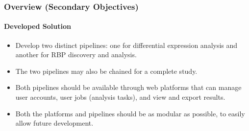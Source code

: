 \documentclass[xcolor=dvipsnames]{beamer}
\begin{document}
\begin{frame}[allowframebreaks]
  \frametitle{Overview (Secondary Objectives)}
  \framesubtitle{Developed Solution}

\begin{itemize}

\item
Develop two distinct pipelines: one for differential expression analysis and
another for RBP discovery and analysis.\\ \vspace{0.6cm}

\item
The two pipelines may also be chained for a complete study.\\ \vspace{0.6cm}

\item
Both pipelines should be available through web platforms that can manage user
accounts, user jobs (analysis tasks), and view and export results.\\
\vspace{0.6cm}


\item
Both the platforms and pipelines should be as modular as possible, to easily
allow future development.




\end{itemize}


\end{frame}
\end{document}
